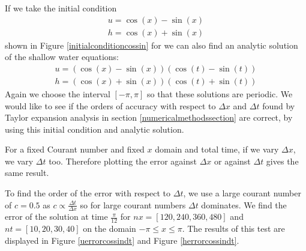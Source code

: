 \documentclass[a4paper,12pt, notitlepage]{article}
\begin{document}

If we take the initial condition 
\begin{eqnarray} \label{ic}
u  =  \cos(x) - \sin(x)\\
 h  =  \cos(x) + \sin(x)
\end{eqnarray}
shown in Figure \ref{initialconditioncossin} for we can also find an analytic solution of the shallow water equations:
\begin{eqnarray} \label{as}
u = (\cos(x) - \sin(x))(\cos(t) - \sin(t))\\
h = (\cos(x) + \sin(x))(\cos(t) + \sin(t))
\end{eqnarray}
Again we choose the interval $[-\pi, \pi]$ so that these solutions are periodic.
We would like to see if the orders of accuracy with respect to $\Delta x$ and $\Delta t$ found by Taylor expansion analysis in section \ref{numericalmethodssection} are correct, by using this initial condition and analytic solution.

For a fixed Courant number and fixed $x$ domain and total time, if we vary $\Delta x$, we vary $\Delta t$ too. Therefore plotting the error against $\Delta x$ or against $\Delta t$ gives the same result.  

To find the order of the error with respect to $\Delta t$, we use a large courant number of $c = 0.5$ as $c \propto \frac{\Delta t}{\Delta x}$ so for large courant numbers $\Delta t$ dominates. We find the error of the solution at time $\frac{\pi}{12}$ for $nx = [120, 240, 360, 480]$ and $nt = [10, 20, 30, 40]$ on the domain $-\pi \leq x \leq \pi$. The results of this test are displayed in Figure \ref{uerrorcossindt} and Figure \ref{herrorcossindt}.
\end{document}
